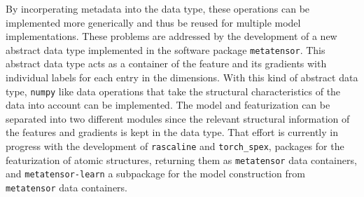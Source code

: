 By incorperating metadata into the data type, these operations can be implemented more generically and thus be reused for multiple model implementations.
These problems are addressed by the development of a new abstract data type implemented in the software package \texttt{metatensor}.
This abstract data type acts as a container of the feature and its gradients with individual labels for each entry in the dimensions.
With this kind of abstract data type, \texttt{numpy} like data operations that take the structural characteristics of the data into account can be implemented.
The model and featurization can be separated into two different modules since the relevant structural information of the features and gradients is kept in the data type.
That effort is currently in progress with the development of \texttt{rascaline} and \texttt{torch\_spex}, packages for the featurization of atomic structures, returning them as \texttt{metatensor} data containers, and \texttt{metatensor-learn} a subpackage for the model construction from \texttt{metatensor} data containers.



